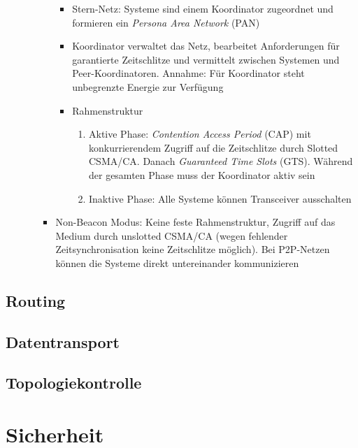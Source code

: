 \begin{itemize}
\begin{itemize}
\begin{itemize}
\begin{itemize}
				\item Stern-Netz: Systeme sind einem Koordinator zugeordnet und formieren ein \textit{Persona Area Network} (PAN)
				\item Koordinator verwaltet das Netz, bearbeitet Anforderungen für garantierte Zeitschlitze und vermittelt zwischen Systemen und Peer-Koordinatoren. Annahme: Für Koordinator steht unbegrenzte Energie zur Verfügung
				\item Rahmenstruktur
				\begin{enumerate}
					\item Aktive Phase: \textit{Contention Access Period} (CAP) mit konkurrierendem Zugriff auf die Zeitschlitze durch Slotted CSMA/CA. Danach \textit{Guaranteed Time Slots} (GTS). Während der gesamten Phase muss der Koordinator aktiv sein
					\item Inaktive Phase: Alle Systeme können Transceiver ausschalten
				\end{enumerate}
			\end{itemize}
			\item Non-Beacon Modus: Keine feste Rahmenstruktur, Zugriff auf das Medium durch unslotted CSMA/CA (wegen fehlender Zeitsynchronisation keine Zeitschlitze möglich). Bei P2P-Netzen können die Systeme direkt untereinander kommunizieren
		\end{itemize}
	\end{itemize}
\end{itemize}


\subsection{Routing}


\subsection{Datentransport}


\subsection{Topologiekontrolle}



\section{Sicherheit}